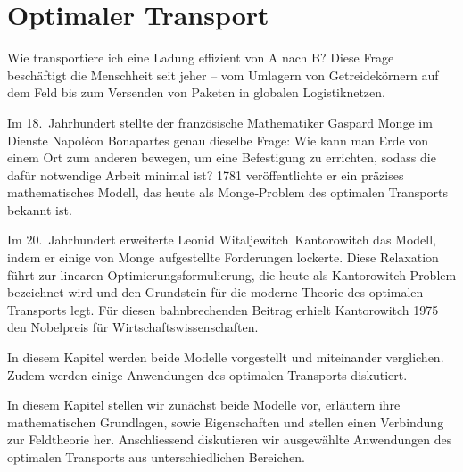 %
%
%
%
\chapter{Optimaler Transport\label{chapter:mongekant}}
\begin{refsection}

\noindent
Wie transportiere ich eine Ladung effizient von A nach B?
Diese Frage beschäftigt die Menschheit seit jeher --
vom Umlagern von Getreidekörnern auf dem Feld
bis zum Versenden von Paketen in globalen Logistiknetzen.

Im 18.~Jahrhundert stellte der französische Mathematiker Gaspard Monge
im Dienste Napoléon Bonapartes genau dieselbe Frage:
Wie kann man Erde von einem Ort zum anderen bewegen,
um eine Befestigung zu errichten,
sodass die dafür notwendige Arbeit minimal ist?
1781 veröffentlichte er ein präzises mathematisches Modell,
das heute als Monge‑Problem des optimalen Transports bekannt ist.

Im 20.~Jahrhundert erweiterte Leonid Witaljewitch~Kantorowitch das Modell,
indem er einige von Monge aufgestellte Forderungen lockerte.
Diese Relaxation führt zur linearen Optimierungsformulierung,
die heute als Kantorowitch‑Problem bezeichnet wird
und den Grundstein für die moderne Theorie des optimalen Transports legt.
Für diesen bahnbrechenden Beitrag erhielt Kantorowitch 1975
den Nobelpreis für Wirtschaftswissenschaften.

In diesem Kapitel werden beide Modelle vorgestellt und miteinander verglichen.
Zudem werden einige Anwendungen des optimalen Transports diskutiert.

In diesem Kapitel stellen wir zunächst beide Modelle vor,
erläutern ihre mathematischen Grundlagen, sowie Eigenschaften und
stellen einen Verbindung zur Feldtheorie her.
Anschliessend diskutieren wir ausgewählte Anwendungen des optimalen Transports
aus unterschiedlichen Bereichen.







\printbibliography[heading=subbibliography]
\end{refsection}
